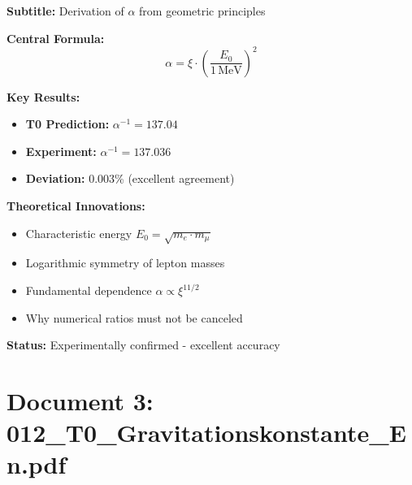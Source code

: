 	\begin{documentbox}
		\textbf{Subtitle:} Derivation of $\alpha$ from geometric principles
		
		\textbf{Central Formula:}
		\begin{equation}
			\boxed{\alpha = \xi \cdot \left(\frac{E_0}{1\,\text{MeV}}\right)^2}
		\end{equation}
		
		\textbf{Key Results:}
		\begin{itemize}
			\item \textbf{T0 Prediction:} $\alpha^{-1} = 137.04$
			\item \textbf{Experiment:} $\alpha^{-1} = 137.036$
			\item \textbf{Deviation:} 0.003\% (excellent agreement)
		\end{itemize}
		
		\textbf{Theoretical Innovations:}
		\begin{itemize}
			\item Characteristic energy $E_0 = \sqrt{m_e \cdot m_\mu}$
			\item Logarithmic symmetry of lepton masses
			\item Fundamental dependence $\alpha \propto \xi^{11/2}$
			\item Why numerical ratios must not be canceled
		\end{itemize}
		
		\textbf{Status:} Experimentally confirmed - excellent accuracy
	\end{documentbox}
	
	\section{Document 3: 012\_T0\_Gravitationskonstante\_En.pdf}
	
